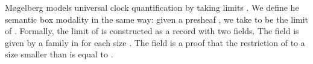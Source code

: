 M{\o}gelberg models universal clock
quantification by taking limits \cite{Mogelberg14}. We define he semantic box modality  in the same way:
given a presheaf ,
we take   to be the limit of . Formally, the limit of
 is constructed as a record with two fields. The field 
is given by a family  in   for each size
.  The field  is a proof that the restriction of  to a size  smaller than  is equal to .
\begin{code}%
\>[0]\AgdaSpace{}%
\AgdaSpace{}%
\AgdaSymbol{(}\AgdaSpace{}%
\AgdaSymbol{:}\AgdaSpace{}%
\AgdaSpace{}%
\AgdaSymbol{)}\AgdaSpace{}%
\AgdaSymbol{:}\AgdaSpace{}%
\AgdaSpace{}%
\AgdaSpace{}%
\<%
\\
\>[0][@{}l@{\AgdaIndent{0}}]%
\>[2]\<%
\\
\>[2][@{}l@{\AgdaIndent{0}}]%
\>[4]\AgdaSpace{}%
\AgdaSymbol{:}\AgdaSpace{}%
\AgdaSymbol{(}\AgdaSpace{}%
\AgdaSymbol{:}\AgdaSpace{}%
\AgdaSymbol{)}\AgdaSpace{}%
\AgdaSpace{}%
\AgdaSpace{}%
\AgdaSpace{}%
\<%
\\
%
\>[4]\AgdaSpace{}%
\AgdaSymbol{:}\AgdaSpace{}%
\AgdaSymbol{(}\AgdaSpace{}%
\AgdaSymbol{:}\AgdaSpace{}%
\AgdaSymbol{)}\AgdaSpace{}%
\AgdaSymbol{(}\AgdaSpace{}%
\AgdaSymbol{:}\AgdaSpace{}%
\AgdaSpace{}%
\AgdaSymbol{(}\AgdaSpace{}%
\AgdaSymbol{))}\AgdaSpace{}%
\AgdaSpace{}%
\AgdaSpace{}%
\AgdaSpace{}%
\AgdaSpace{}%
\AgdaSpace{}%
\AgdaSymbol{(}\AgdaSpace{}%
\AgdaSymbol{)}\AgdaSpace{}%
\AgdaSpace{}%
\AgdaSpace{}%
\<%
\end{code}
